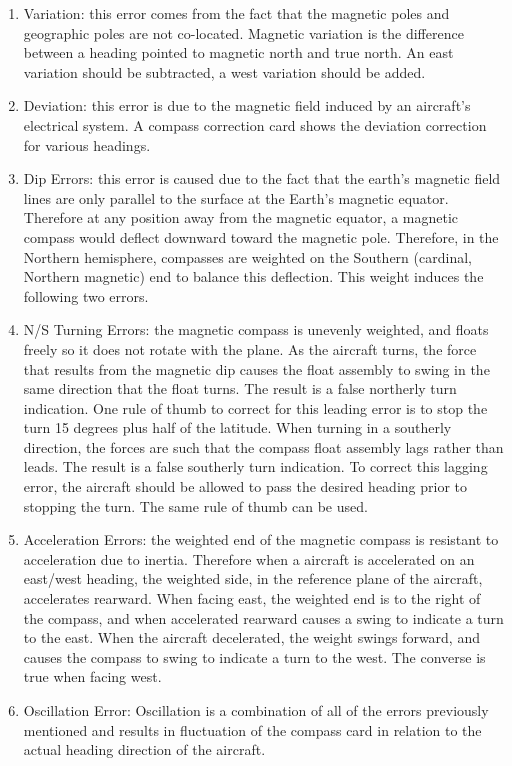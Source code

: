 \documentclass[12pt]{article}
\begin{document}
				\begin{enumerate}
					\item Variation: this error comes from the fact that the magnetic poles and geographic poles are not co-located. Magnetic variation is the difference between a heading pointed to magnetic north and true north. An east variation should be subtracted, a west variation should be added.
					\item Deviation: this error is due to the magnetic field induced by an aircraft's electrical system. A compass correction card shows the deviation correction for various headings.
					\item Dip Errors: this error is caused due to the fact that the earth's magnetic field lines are only parallel to the surface at the Earth's magnetic equator. Therefore at any position away from the magnetic equator, a magnetic compass would deflect downward toward the magnetic pole. Therefore, in the Northern hemisphere, compasses are weighted on the Southern (cardinal, Northern magnetic) end to balance this deflection. This weight induces the following two errors.
					\item N/S Turning Errors: the magnetic compass is unevenly weighted, and floats freely so it does not rotate with the plane. As the aircraft turns, the force that results from the magnetic dip causes the float assembly to swing in the same direction that the float turns. The result is a false northerly turn indication. One rule of thumb to correct for this leading error is to stop the turn 15 degrees plus half of the latitude. When turning in a southerly direction, the forces are such that the compass float assembly lags rather than leads. The result is a false southerly turn indication. To correct this lagging error, the aircraft should be allowed to pass the desired heading prior to stopping the turn. The same rule of thumb can be used.
					\item Acceleration Errors: the weighted end of the magnetic compass is resistant to acceleration due to inertia. Therefore when a aircraft is accelerated on an east/west heading, the weighted side, in the reference plane of the aircraft, accelerates rearward. When facing east, the weighted end is to the right of the compass, and when accelerated rearward causes a swing to indicate a turn to the east. When the aircraft decelerated, the weight swings forward, and causes the compass to swing to indicate a turn to the west. The converse is true when facing west.
					\item Oscillation Error: Oscillation is a combination of all of the errors previously mentioned and results in fluctuation of the compass card in relation to the actual heading direction of the aircraft. 
				\end{enumerate}
\end{document}
